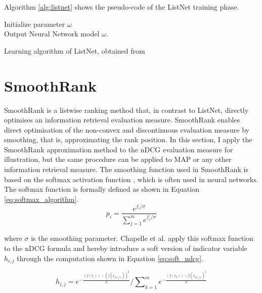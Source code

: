 \noindent Algorithm \ref{alg:listnet} shows the pseudo-code of the ListNet training phase.\\
\LinesNumbered
\begin{algorithm}[H]
 Initialize parameter $\omega$\\
 Output Neural Network model $\omega$.
 \caption{Learning algorithm of ListNet, obtained from \cite{Cao2007}}
 \label{alg:listnet}
\end{algorithm}

\section{SmoothRank}
SmoothRank \cite{Chapelle2010} is a listwise ranking method that, in contrast to ListNet, directly optimises an information retrieval evaluation measure. SmoothRank enables direct optimisation of the non-convex and discontinuous evaluation measure by smoothing, that is, approximating the rank position. In this section, I apply the SmoothRank approximation method to the \ac{nDCG} evaluation measure for illustration, but the same procedure can be applied to \ac{MAP} or any other information retrieval measure. The smoothing function used in SmoothRank is based on the softmax activation function \cite{Bridle1990}, which is often used in neural networks. The softmax function is formally defined as shown in Equation \ref{eq:softmax_algorithm}.
\begin{equation}
p_i = \frac{e^{f_i/\sigma}}{\sum\nolimits_{j=1}^{m}e^{f_j/\sigma}}
\label{eq:softmax_algorithm}
\end{equation}

where $\sigma$ is the smoothing parameter. Chapelle et al. \cite{Chapelle2010} apply this softmax function to the \ac{nDCG} formula and hereby introduce a soft version of indicator variable $h_{i,j}$ through the computation shown in Equation \ref{eq:soft_ndcg}.

\begin{equation}
h_{i,j} = e^{-\frac{(f(x_i))-(f(x_{d(j)}))^2}{\sigma}}\Big/\sum\nolimits_{k=1}^{m}e^{-\frac{(f(x_k))-f(x_{d(j)})^2}{\sigma}}
\label{eq:soft_ndcg}
\end{equation}


